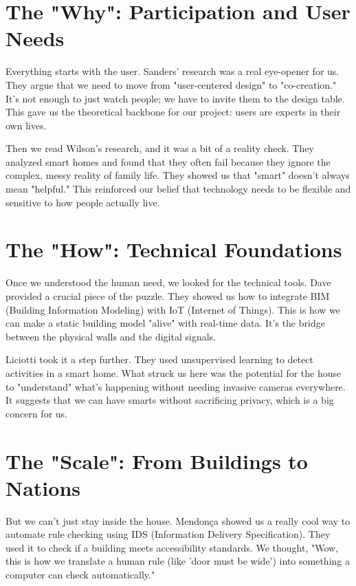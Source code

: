 \documentclass[a4paper,oneside,12pt]{report}
\begin{document}
\section{The "Why": Participation and User Needs}
Everything starts with the user. Sanders' research\cite{Sanders2008} was a real eye-opener for us. They argue that we need to move from "user-centered design" to "co-creation." It's not enough to just watch people; we have to invite them to the design table. This gave us the theoretical backbone for our project: users are experts in their own lives.

Then we read Wilson's research\cite{Wilson2015}, and it was a bit of a reality check. They analyzed smart homes and found that they often fail because they ignore the complex, messy reality of family life. They showed us that "smart" doesn't always mean "helpful." This reinforced our belief that technology needs to be flexible and sensitive to how people actually live.

\section{The "How": Technical Foundations}
Once we understood the human need, we looked for the technical tools. Dave\cite{Dave2018} provided a crucial piece of the puzzle. They showed us how to integrate BIM (Building Information Modeling) with IoT (Internet of Things). This is how we can make a static building model "alive" with real-time data. It's the bridge between the physical walls and the digital signals.

Liciotti\cite{Liciotti2020} took it a step further. They used unsupervised learning to detect activities in a smart home. What struck us here was the potential for the house to "understand" what's happening without needing invasive cameras everywhere. It suggests that we can have smarts without sacrificing privacy, which is a big concern for us.

\section{The "Scale": From Buildings to Nations}
But we can't just stay inside the house. Mendonça\cite{Mendonca2024} showed us a really cool way to automate rule checking using IDS (Information Delivery Specification). They used it to check if a building meets accessibility standards. We thought, "Wow, this is how we translate a human rule (like 'door must be wide') into something a computer can check automatically."
\end{document}

